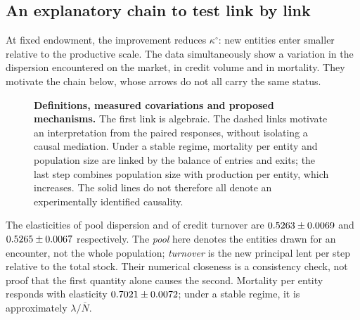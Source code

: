 \subsection{An explanatory chain to test link by link}
At fixed endowment, the improvement reduces $\kappa^\circ$: new
entities enter smaller relative to the productive scale. The data
simultaneously show a variation in the dispersion encountered on the
market, in credit volume and in mortality. They motivate the chain
below, whose arrows do not all carry the same status.

\begin{figure}[htbp]\centering
{}
\caption{\textbf{Definitions, measured covariations and proposed
mechanisms.} The first link is algebraic. The dashed links motivate an
interpretation from the paired responses, without isolating a causal
mediation. Under a stable regime, mortality per entity and population
size are linked by the balance of entries and exits; the last step
combines population size with production per entity, which increases.
The solid lines do not therefore all denote an experimentally
identified causality.}
\label{fig:chaine}
\end{figure}

The elasticities of pool dispersion and of credit turnover are
$0.5263\pm0.0069$ and
$0.5265\pm0.0067$ respectively. The
\emph{pool} here denotes the entities drawn for an encounter, not the
whole population; \emph{turnover} is the new principal lent per step
relative to the total stock. Their numerical closeness is a consistency
check, not proof that the first quantity alone causes the second.
Mortality per entity responds with elasticity
$0.7021\pm0.0072$; under a stable regime,
it is approximately $\lambda/\overline N$.

